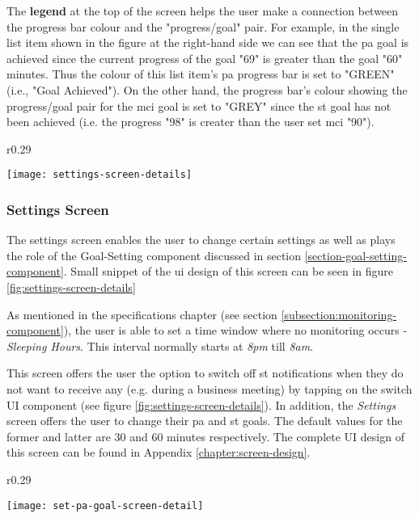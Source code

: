     The \textbf{legend} at the top of the screen helps the user make a connection between the progress bar colour and the "progress/goal" pair. For example, in the single list item shown in the figure at the right-hand side we can see that the \gls{pa} goal is achieved since the current progress of the goal "69" is greater than the goal "60" minutes. Thus the colour of this list item's \gls{pa} progress bar is set to "GREEN" (i.e., "Goal Achieved"). On the other hand, the progress bar's colour showing the progress/goal pair for the \gls{mci} goal is set to "GREY" since the \gls{st} goal has not been achieved (i.e. the progress "98" is creater than the user set \gls{mci} "90").
    
    \begin{wrapfigure}[11]{r}{0.29\textwidth}
    \begin{center}
    \texttt{[image: settings-screen-details]}
    \end{center}
    \caption{Settings screen snippet}
    \label{fig:settings-screen-details}
    \end{wrapfigure}
    
    \subsubsection{Settings Screen}
    The settings screen enables the user to change certain settings as well as plays the role of the Goal-Setting component discussed in section \ref{section-goal-setting-component}. Small snippet of the \gls{ui} design of this screen can be seen in figure \ref{fig:settings-screen-details}
    
    As mentioned in the specifications chapter (see section \ref{subsection:monitoring-component}), the user is able to set a time window where no monitoring occurs - \textit{Sleeping Hours}. This interval normally starts at \textit{8pm} till \textit{8am}.
    
    This screen offers the user the option to switch off \gls{st} notifications when they do not want to receive any (e.g. during a business meeting) by tapping on the switch UI component (see figure \ref{fig:settings-screen-details}). In addition, the \textit{Settings} screen offers the user to change their \gls{pa} and \gls{st} goals. The default values for the former and latter are 30 and 60 minutes respectively. The complete UI design of this screen can be found in Appendix \ref{chapter:screen-design}.
    
     
    \begin{wrapfigure}[8]{r}{0.29\textwidth}
    \begin{center}
    \texttt{[image: set-pa-goal-screen-detail]}
    \end{center}
    \caption{SET PA GOAL screen snippet}
    \label{fig:set-pa-goal-screen-snippet}
    \end{wrapfigure}
    
